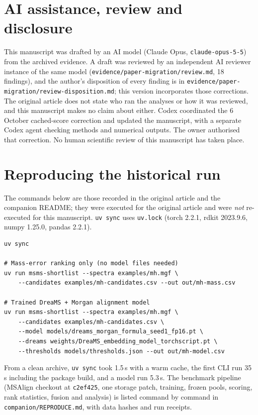 \documentclass[11pt]{article}
\newcommand{\m}[1]{\texttt{#1}}
\begin{document}
\section{AI assistance, review and disclosure}\label{sec:disclosure}
This manuscript was drafted by an AI model (Claude Opus, \texttt{claude-opus-5-5}) from the archived evidence. A draft was
reviewed by an independent AI reviewer instance of the same model (\texttt{evidence/paper-migration/review.md}, 18 findings),
and the author's disposition of every finding is in \texttt{evidence/paper-migration/review-disposition.md}; this version
incorporates those corrections. The original article does not state who ran the analyses or how it was reviewed, and this
manuscript makes no claim about either. Codex coordinated the 6 October cached-score correction and updated the manuscript,
with a separate Codex agent checking methods and numerical outputs. The owner authorised that correction.
No human scientific review of this manuscript has taken place.




\clearpage
\appendix
\section{Reproducing the historical run}\label{app:repro}
The commands below are those recorded in the original article and the companion README; they were executed for the original
article and were \emph{not} re-executed for this manuscript. \m{uv sync} uses \m{uv.lock} (torch 2.2.1, rdkit 2023.9.6, numpy
1.25.0, pandas 2.2.1).
\begin{lstlisting}
uv sync

# Mass-error ranking only (no model files needed)
uv run msms-shortlist --spectra examples/mh.mgf \
    --candidates examples/mh-candidates.csv --out out/mh-mass.csv

# Trained DreaMS + Morgan alignment model
uv run msms-shortlist --spectra examples/mh.mgf \
    --candidates examples/mh-candidates.csv \
    --model models/dreams_morgan_formula_seed1_fp16.pt \
    --dreams weights/DreaMS_embedding_model_torchscript.pt \
    --thresholds models/thresholds.json --out out/mh-model.csv
\end{lstlisting}
From a clean archive, \m{uv sync} took 1.5\,s with a warm cache, the first CLI run 35\,s including the package build, and a model
run 5.3\,s. The benchmark pipeline (MSAlign checkout at \m{c2ef425}, one storage patch, training, frozen pools, scoring, rank
statistics, fusion and analysis) is listed command by command in \m{companion/REPRODUCE.md}, with data hashes and run receipts.
\end{document}
